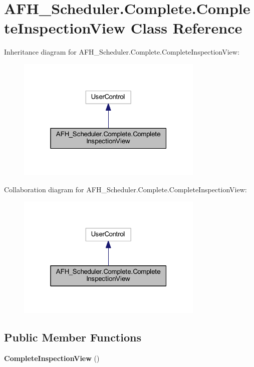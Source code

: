 \section{A\+F\+H\+\_\+\+Scheduler.\+Complete.\+Complete\+Inspection\+View Class Reference}
\label{class_a_f_h___scheduler_1_1_complete_1_1_complete_inspection_view}


Inheritance diagram for A\+F\+H\+\_\+\+Scheduler.\+Complete.\+Complete\+Inspection\+View\+:
\nopagebreak
\begin{figure}[H]
\begin{center}
\leavevmode
\includegraphics[width=253pt]{class_a_f_h___scheduler_1_1_complete_1_1_complete_inspection_view__inherit__graph}
\end{center}
\end{figure}


Collaboration diagram for A\+F\+H\+\_\+\+Scheduler.\+Complete.\+Complete\+Inspection\+View\+:
\nopagebreak
\begin{figure}[H]
\begin{center}
\leavevmode
\includegraphics[width=253pt]{class_a_f_h___scheduler_1_1_complete_1_1_complete_inspection_view__coll__graph}
\end{center}
\end{figure}
\subsection*{Public Member Functions}
\begin{DoxyCompactItemize}
\item 
\textbf{ Complete\+Inspection\+View} ()
\end{DoxyCompactItemize}


